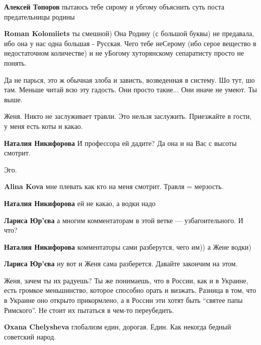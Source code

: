 \begin{itemize}
\begin{itemize}
\textbf{Алексей Топоров} пытаюсь тебе сирому и убгому объяснить суть поста предательницы родины

\textbf{Roman Kolomiiets} ты смешной) Она Родину (с большой буквы) не предавала, ибо она у нас одна большая - Русская. Чего тебе неСерому (ибо серое вещество в недостаточном количестве) и не уБогому хуторянскому сепаратисту просто не понять.
\end{itemize} %


Да не парься, это ж обычная злоба и зависть, возведенная в систему. Шо тут, шо
там. Меньше читай всю эту гадость. Они просто такие... Они иначе не умеют. Ты
выше.

Женя. Никто не заслуживает травли. Это нельзя заслужить.
Приезжайте в гости, у меня есть коты и какао.

\begin{itemize} %
\textbf{Наталия Никифорова}
И профессора ей дадите?
Да она и на Вас с высоты смотрит.

Эго.

\textbf{Alina Kova} мне плевать как кто на меня смотрит. Травля = мерзость.

\textbf{Наталия Никифорова} ей не какао, а водки надо

\textbf{Лариса Юр'єва} а многим комментаторам в этой ветке — узбагоительного. И что?

\textbf{Наталия Никифорова} комментаторы сами разберутся, чего им)) а Жене водки)

\textbf{Лариса Юр'єва} ну вот и Женя сама разберется. Давайте закончим на этом.
\end{itemize} %


Женя, зачем ты их радуешь? Ты же понимаешь, что в России, как и в Украине, есть
громкое меньшинство, которое способно орать и визжать. Разница в том, что в
Украине оно открыто прикормлено, а в России эти хотят быть \enquote{святее папы
Римского}. Не стоит их пытаться в чем-то переубедить.

\begin{itemize} %
\textbf{Oxana Chelysheva} глобализм един, дорогая. Един. Как некогда бедный советский народ.


\end{itemize}
\end{itemize}
